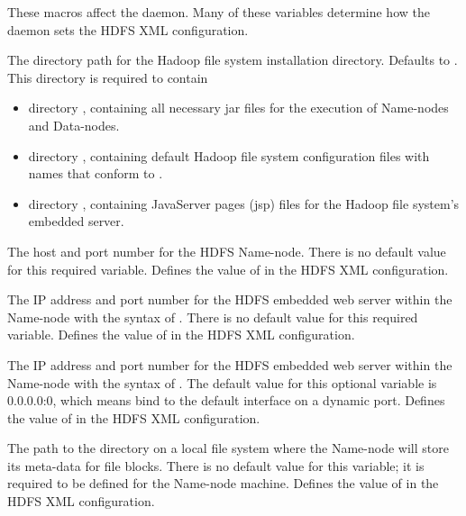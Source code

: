 These macros affect the  daemon.
Many of these variables determine how the  daemon sets
the HDFS XML configuration.

\begin{description}

\label{param:HDFSHome}
\item[\Macro{HDFS\_HOME}]
  The directory path for the Hadoop file system installation directory.
  Defaults to .
  This directory is required to contain 

  \begin{itemize}
  \item{directory },
  containing all necessary jar files for the execution of Name-nodes
  and Data-nodes.
  \item{directory },
  containing default Hadoop file system configuration files with names that
  conform to .
  \item{directory },
  containing JavaServer pages (jsp) files for the Hadoop file 
  system's embedded server.
  \end{itemize}

\label{param:HDFSNamenode}
\item[\Macro{HDFS\_NAMENODE}]
  The host and port number for the HDFS Name-node.
  There is no default value for this required variable.
  Defines the value of  in the HDFS XML configuration.

\label{param:HDFSNamenodeWeb}
\item[\Macro{HDFS\_NAMENODE\_WEB}]
  The IP address and port number for the HDFS embedded web server within the
  Name-node with the syntax of .
  There is no default value for this required variable.
  Defines the value of  in the HDFS XML configuration.

\label{param:HDFSNamenodeWeb}
\item[\Macro{HDFS\_DATANODE\_WEB}]
  The IP address and port number for the HDFS embedded web server within the
  Name-node with the syntax of .
  The default value for this optional variable is 0.0.0.0:0, which means
  bind to the default interface on a dynamic port.
  Defines the value of  in 
  the HDFS XML configuration.

\label{param:HDFSNamenodeDir}
\item[\Macro{HDFS\_NAMENODE\_DIR}]
  The path to the directory on a local file system where the Name-node will
  store its meta-data for file blocks.
  There is no default value for this variable; it is required to be defined
  for the Name-node machine.
  Defines the value of  in the HDFS XML configuration.


\end{description}

